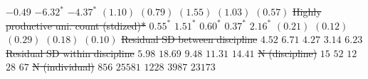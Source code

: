 \documentclass[
  10pt,
  letterpaper,
]{article}
\providecommand{\DIFdeltex}[1]{{\protect\color{red}\sout{#1}}}                      %
\providecommand{\DIFdelFL}[1]{\DIFdel{#1}} %
\providecommand{\DIFaddbeginFL}{} %
\providecommand{\DIFdelendFL}{} %
\providecommand{\DIFdel}[1]{\texorpdfstring{\DIFdeltex{#1}}{}} %
\newcommand{\DIFaddincludegraphics}[2][]{{\color{blue}\fbox{\DIFOincludegraphics[#1]{#2}}}} %
\DeclareRobustCommand{\DIFaddbeginFL}{\DIFOaddbeginFL \let\includegraphics\DIFaddincludegraphics} %
\DeclareRobustCommand{\DIFdelendFL}{\DIFOaddendFL \let\includegraphics\DIFOincludegraphics} %
\begin{document}
\begin{table}
\begin{adjustwidth}{-1.5in}{0in}
\DIFdelFL{$-0.49$     }%
\DIFdelFL{$-6.32^{*}$  }%
\DIFdelFL{$-4.37^{*}$  }%
\DIFdelFL{$(1.10)$     }%
\DIFdelFL{$(0.79)$     }%
\DIFdelFL{$(1.55)$    }%
\DIFdelFL{$(1.03)$     }%
\DIFdelFL{$(0.57)$     }%
\DIFdelFL{Highly productive uni. count (stdized)* }%
\DIFdelFL{$0.55^{*}$   }%
\DIFdelFL{$1.51^{*}$   }%
\DIFdelFL{$0.60^{*}$  }%
\DIFdelFL{$0.37^{*}$   }%
\DIFdelFL{$2.16^{*}$   }%
\DIFdelFL{$(0.21)$     }%
\DIFdelFL{$(0.12)$     }%
\DIFdelFL{$(0.29)$    }%
\DIFdelFL{$(0.18)$     }%
\DIFdelFL{$(0.10)$     }%
\DIFdelFL{Residual SD between discipline          }%
\DIFdelFL{$4.52$       }%
\DIFdelFL{$6.71$       }%
\DIFdelFL{$4.27$      }%
\DIFdelFL{$3.14$       }%
\DIFdelFL{$6.23$       }%
\DIFdelFL{Residual SD within discipline           }%
\DIFdelFL{$5.98$       }%
\DIFdelFL{$18.69$      }%
\DIFdelFL{$9.48$      }%
\DIFdelFL{$11.31$      }%
\DIFdelFL{$14.41$      }%
\DIFdelFL{N (discipline)                          }%
\DIFdelFL{$15$         }%
\DIFdelFL{$52$         }%
\DIFdelFL{$12$        }%
\DIFdelFL{$28$         }%
\DIFdelFL{$67$         }%
\DIFdelFL{N (individual)                          }%
\DIFdelFL{$856$        }%
\DIFdelFL{$25581$      }%
\DIFdelFL{$1228$      }%
\DIFdelFL{$3987$       }%
\DIFdelFL{$23173$      }%
\DIFdelendFL \DIFaddbeginFL 


\end{adjustwidth}
\end{table}
\end{document}
